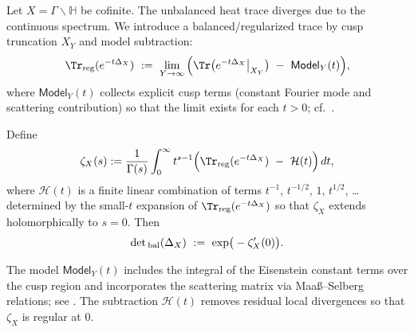 Let $X=\Gamma\backslash\mathbb{H}$ be cofinite. The unbalanced heat trace diverges due to the continuous spectrum. \relax\hspace{0pt}
We introduce a balanced/regularized trace by cusp truncation $X_Y$ and model subtraction:
\begin{equation}\relax\hspace{0pt}
\label{eq:tfc7-trreg}\relax\hspace{0pt}
\Tr_{\mathrm{reg}}(e^{-t\Delta_X})\ :=\ \lim_{Y\to\infty}\Big(\Tr\big(e^{-t\Delta_X}\big|_{X_Y}\big)\ -\ \mathsf{Model}_Y(t)\Big),
\end{equation}
where $\mathsf{Model}_Y(t)$ collects explicit cusp terms (constant Fourier mode and scattering contribution) so that the limit exists for each $t>0$; cf.\ \cite{Muller,HeJi,Borthwick}. \relax\hspace{0pt}

\begin{definition}\relax\hspace{0pt}
\label{def:tfc7-balanced}\relax\hspace{0pt}
Define
\begin{equation}\relax\hspace{0pt}
\label{eq:tfc7-zetaX}\relax\hspace{0pt}
\zeta_X(s):=\frac{1}{\Gamma(s)}\int_0^\infty t^{s-1}\Big(\Tr_{\mathrm{reg}}(e^{-t\Delta_X})\ -\ \mathcal{H}(t)\Big)\,dt,
\end{equation}
where $\mathcal{H}(t)$ is a finite linear combination of terms $t^{-1}$, $t^{-1/2}$, $1$, $t^{1/2}$, \dots determined by the small-$t$ expansion of $\Tr_{\mathrm{reg}}(e^{-t\Delta_X})$ so that $\zeta_X$ extends holomorphically to $s=0$. Then
\begin{equation}\relax\hspace{0pt}
\label{eq:tfc7-detX}\relax\hspace{0pt}
\det{}_{\mathrm{bal}}(\Delta_X)\ :=\ \exp\!\big(-\zeta_X'(0)\big).
\end{equation}
\end{definition}

\begin{remark}\relax\hspace{0pt}
\label{rem:tfc7-model}\relax\hspace{0pt}
The model $\mathsf{Model}_Y(t)$ includes the integral of the Eisenstein constant terms over the cusp region and incorporates the scattering matrix via Maaß--Selberg relations; see \cite{HejhalII,Borthwick}. The subtraction $\mathcal{H}(t)$ removes residual local divergences so that $\zeta_X$ is regular at $0$. \relax\hspace{0pt}
\end{remark}

